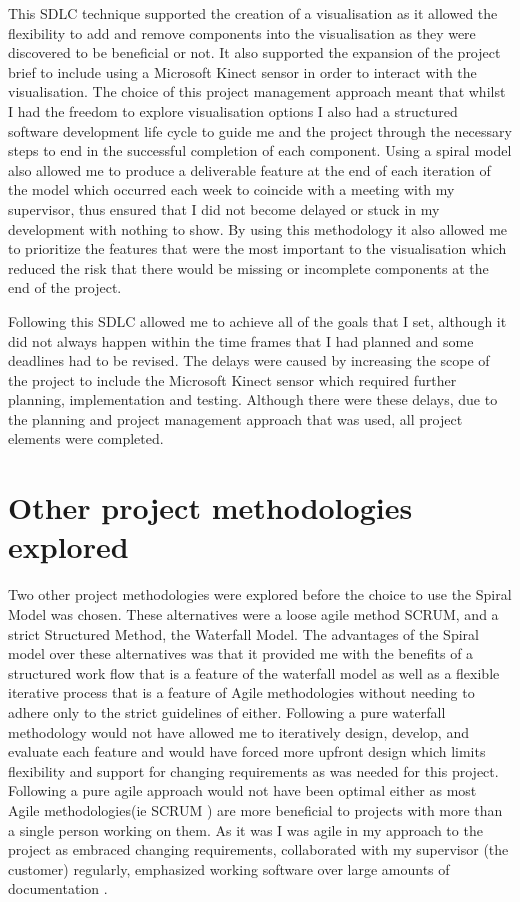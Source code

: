 This SDLC technique supported the creation of a visualisation as
it allowed the flexibility to add and remove components into the visualisation
as they were discovered to be beneficial or not. It also supported the expansion
of the project brief to include using a Microsoft Kinect sensor in order to
interact with the visualisation. The choice of this project management approach
meant that whilst I had the freedom to explore visualisation options I also had
a structured software development life cycle to guide me and the project through
the necessary steps to end in the successful completion of each
component.
%
Using a spiral model also allowed me to produce a deliverable feature at the end
of each iteration of the model which occurred each week to coincide with a
meeting with my supervisor, thus ensured that I did not become delayed or stuck
in my development with nothing to show. By using this methodology it also
allowed me to prioritize the features that were the most important to the
visualisation which reduced the risk that there would be missing or incomplete
components at the end of the project. 

Following this SDLC allowed me to achieve all of the goals
that I set, although it did not always happen within the time frames that I had
planned and some deadlines had to be revised. The delays were caused by
increasing the scope of the project to include the Microsoft Kinect sensor which
required further planning, implementation and testing. Although there were these
delays, due to the planning and project management approach that was used, all
project elements were completed.


\section{Other project methodologies explored}
Two other project methodologies were explored before the choice to use the
Spiral Model was chosen. These alternatives were a loose agile method SCRUM, and
a strict Structured Method, the Waterfall Model. 
The advantages of the Spiral model over these alternatives was that it provided
me with the benefits of a structured work flow that is a feature of the
waterfall model as
well as a flexible iterative process that is a feature of Agile methodologies
without needing to adhere only to the strict guidelines of either. Following a
pure waterfall methodology would not have allowed me to iteratively
design, develop, and evaluate each feature and would have forced more upfront
design which limits flexibility and support for changing requirements as was
needed for this project. Following a pure agile approach would not have been
optimal either as most Agile methodologies(ie SCRUM \cite{schwaber2004agile}) are more
beneficial to projects with more than a single person working on them. As it was
I was agile in my approach to the project as embraced changing requirements,
collaborated with my supervisor (the customer) regularly, emphasized working
software over large amounts of documentation \cite{beck2001agile}. 


